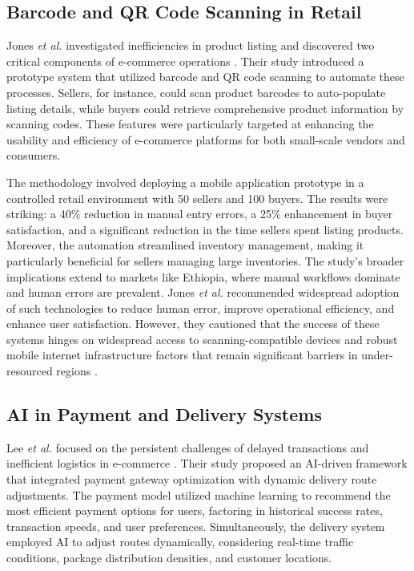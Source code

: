 \documentclass[12pt]{report}
\begin{document}
\subsection*{Barcode and QR Code Scanning in Retail}

Jones \textit{et al.} investigated inefficiencies in product listing and discovered two critical
components of e-commerce operations \cite{c17}. Their study introduced a prototype system that
utilized barcode and QR code scanning to automate these processes. Sellers, for instance,
could scan product barcodes to auto-populate listing details, while buyers could retrieve
comprehensive product information by scanning codes. These features were particularly
targeted at enhancing the usability and efficiency of e-commerce platforms for both
small-scale vendors and consumers.

The methodology involved deploying a mobile application prototype in a controlled retail
environment with 50 sellers and 100 buyers. The results were striking: a 40\% reduction in
manual entry errors, a 25\% enhancement in buyer satisfaction, and a significant reduction in
the time sellers spent listing products. Moreover, the automation streamlined inventory
management, making it particularly beneficial for sellers managing large inventories. The
study’s broader implications extend to markets like Ethiopia, where manual workflows
dominate and human errors are prevalent. Jones \textit{et al.} recommended widespread adoption of
such technologies to reduce human error, improve operational efficiency, and enhance user
satisfaction. However, they cautioned that the success of these systems hinges on widespread
access to scanning-compatible devices and robust mobile internet infrastructure factors that
remain significant barriers in under-resourced regions \cite{c17}.

\subsection*{AI in Payment and Delivery Systems}

Lee \textit{et al.} focused on the persistent challenges of delayed transactions and inefficient logistics
in e-commerce \cite{c18}. Their study proposed an AI-driven framework that integrated payment
gateway optimization with dynamic delivery route adjustments. The payment model utilized
machine learning to recommend the most efficient payment options for users, factoring in
historical success rates, transaction speeds, and user preferences. Simultaneously, the delivery
system employed AI to adjust routes dynamically, considering real-time traffic conditions,
package distribution densities, and customer locations.
\end{document}

